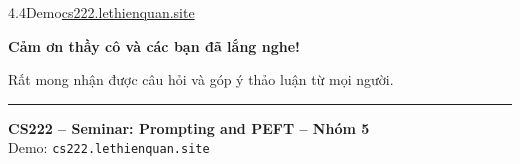 \begin{frame}{4.4\quad Demo}{\href{https://cs222.lethienquan.site}{cs222.lethienquan.site}}
\end{frame}

\begin{frame}[plain,c]
  \centering
  \vspace{1.2em}
  {\Huge \bfseries Cảm ơn thầy cô và các bạn đã lắng nghe!}

  \vspace{0.8em}
  {\large \color{gray} Rất mong nhận được câu hỏi và góp ý thảo luận từ mọi người.}

  \vspace{1.8em}
  \rule{0.45\linewidth}{0.5pt}

  \vspace{1em}
  {\small \textbf{CS222 -- Seminar: Prompting and PEFT -- Nhóm 5}} \\
  \vspace{0.3em}
  {\footnotesize Demo: \texttt{cs222.lethienquan.site}}
\end{frame}
